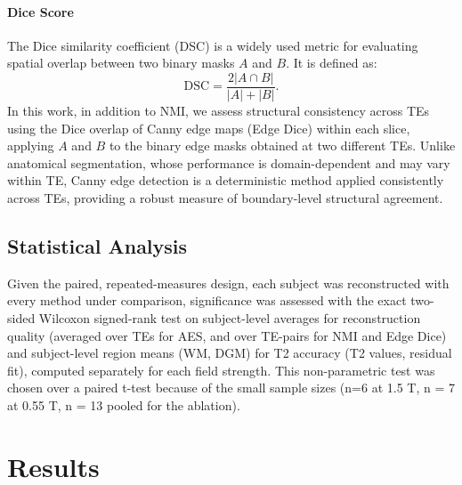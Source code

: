 \documentclass[preprint,authoryear,12pt]{elsarticle}
\begin{document}
\paragraph{Dice Score}
The Dice similarity coefficient (DSC) \citep{dice1945measures} is a widely used metric for evaluating spatial overlap between two binary masks $A$ and $B$. It is defined as:
\begin{equation*}
\mathrm{DSC} = \frac{2 |A \cap B|}{|A| + |B|}.
\end{equation*}
In this work, in addition to NMI, we assess structural consistency across TEs using the Dice overlap of Canny edge maps (Edge Dice) within each slice, applying $A$ and $B$ to the binary edge masks obtained at two different TEs. Unlike anatomical segmentation, whose performance is domain-dependent and may vary within TE, Canny edge detection is a deterministic method applied consistently across TEs, providing a robust measure of boundary-level structural agreement.

\subsection{Statistical Analysis}
\label{sec:stat}
Given the paired, repeated-measures design, each subject was reconstructed with every method under comparison, significance was assessed with the exact two-sided Wilcoxon signed-rank test on subject-level averages for reconstruction quality (averaged over TEs for AES, and over TE-pairs for NMI and Edge Dice) and subject-level region means (WM, DGM) for T2 accuracy (T2 values, residual fit), computed separately for each field strength. This non-parametric test was chosen over a paired t-test because of the small sample sizes (n=6 at 1.5 T, n = 7 at 0.55 T, n = 13 pooled for the ablation).

\newpage




\section{Results}
\end{document}
